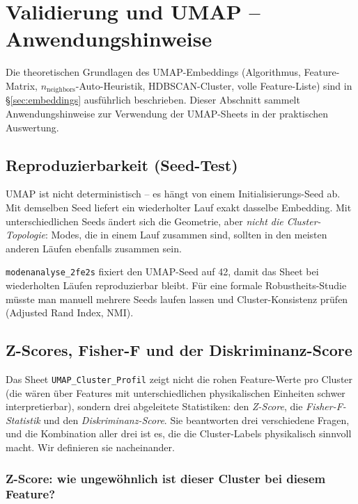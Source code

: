 \documentclass[11pt,a4paper,twoside]{article}
\theoremstyle{remark}
\begin{document}
\section{Validierung und UMAP -- Anwendungshinweise}

Die theoretischen Grundlagen des UMAP-Embeddings (Algorithmus,
Feature-Matrix, $n_\text{neighbors}$-Auto-Heuristik, HDBSCAN-Cluster,
volle Feature-Liste) sind in \S\ref{sec:embeddings} ausf\"uhrlich
beschrieben. Dieser Abschnitt sammelt Anwendungshinweise zur
Verwendung der UMAP-Sheets in der praktischen Auswertung.

\subsection{Reproduzierbarkeit (Seed-Test)}

UMAP ist nicht deterministisch -- es h\"angt von einem
Initialisierungs-Seed ab. Mit demselben Seed liefert ein wiederholter
Lauf exakt dasselbe Embedding. Mit unterschiedlichen Seeds \"andert
sich die Geometrie, aber \emph{nicht die Cluster-Topologie}: Modes,
die in einem Lauf zusammen sind, sollten in den meisten anderen
L\"aufen ebenfalls zusammen sein.

\texttt{modenanalyse\_2fe2s} fixiert den UMAP-Seed auf 42, damit das
Sheet bei wiederholten L\"aufen reproduzierbar bleibt. F\"ur eine
formale Robustheits-Studie m\"usste man manuell mehrere Seeds laufen
lassen und Cluster-Konsistenz pr\"ufen (Adjusted Rand Index, NMI).

\subsection{Z-Scores, Fisher-F und der Diskriminanz-Score}
\label{sec:zscore-fisher}

Das Sheet \texttt{UMAP\_Cluster\_Profil} zeigt nicht die rohen
Feature-Werte pro Cluster (die w\"aren \"uber Features mit
unterschiedlichen physikalischen Einheiten schwer interpretierbar),
sondern drei abgeleitete Statistiken: den \emph{Z-Score}, die
\emph{Fisher-F-Statistik} und den \emph{Diskriminanz-Score}. Sie
beantworten drei verschiedene Fragen, und die Kombination aller
drei ist es, die die Cluster-Labels physikalisch sinnvoll macht.
Wir definieren sie nacheinander.

\subsubsection*{Z-Score: wie ungew\"ohnlich ist dieser Cluster bei diesem Feature?}
\end{document}
